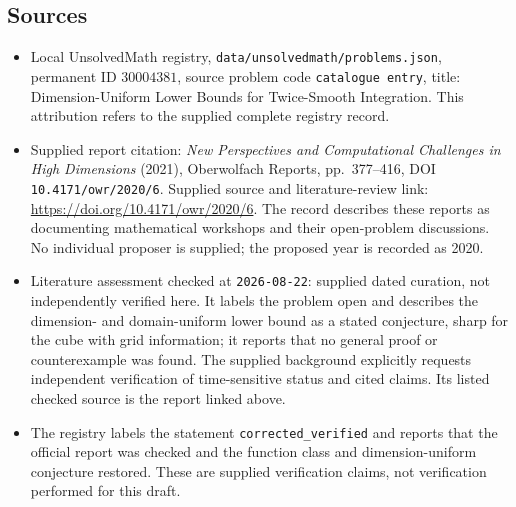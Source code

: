 \documentclass[11pt]{article}
\begin{document}
\subsection{Sources}
\begin{itemize}
\item Local UnsolvedMath registry, \texttt{data/unsolvedmath/problems.json}, permanent ID \(30004381\), source problem code \texttt{catalogue entry}, title: Dimension-Uniform Lower Bounds for Twice-Smooth Integration. This attribution refers to the supplied complete registry record.
\item Supplied report citation: \emph{New Perspectives and Computational Challenges in High Dimensions} (2021), Oberwolfach Reports, pp.\ 377--416, DOI \texttt{10.4171/owr/2020/6}. Supplied source and literature-review link: \url{https://doi.org/10.4171/owr/2020/6}. The record describes these reports as documenting mathematical workshops and their open-problem discussions. No individual proposer is supplied; the proposed year is recorded as 2020.
\item Literature assessment checked at \texttt{2026-08-22}: supplied dated curation, not independently verified here. It labels the problem open and describes the dimension- and domain-uniform lower bound as a stated conjecture, sharp for the cube with grid information; it reports that no general proof or counterexample was found. The supplied background explicitly requests independent verification of time-sensitive status and cited claims. Its listed checked source is the report linked above.
\item The registry labels the statement \texttt{corrected\_verified} and reports that the official report was checked and the function class and dimension-uniform conjecture restored. These are supplied verification claims, not verification performed for this draft.
\end{itemize}
\end{document}
